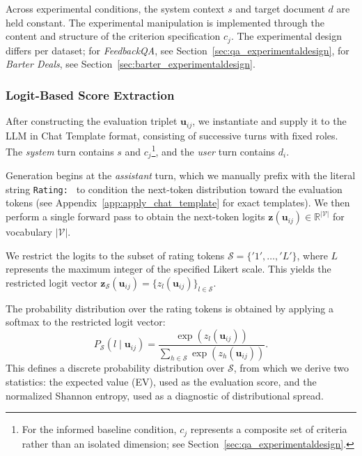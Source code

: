Across experimental conditions, the system context $s$ and target document $d$ are held constant. The experimental manipulation is implemented through the content and structure of the criterion specification $c_j$. The experimental design differs per dataset; for \textit{FeedbackQA}, see Section~\ref{sec:qa_experimentaldesign}, for \textit{Barter Deals}, see Section~\ref{sec:barter_experimentaldesign}. 


\subsubsection{Logit-Based Score Extraction}\label{sec:meth_decoding}

After constructing the evaluation triplet $\mathbf{u}_{ij}$, we instantiate and supply it to the LLM in Chat Template format, consisting of successive turns with fixed roles. The \emph{system} turn contains $s$ and $c_j$\footnote{For the informed baseline condition, $c_j$ represents a composite set of criteria rather than an isolated dimension; see Section~\ref{sec:qa_experimentaldesign}.}, and the \emph{user} turn contains $d_i$.

Generation begins at the \emph{assistant} turn, which we manually prefix with the literal string \texttt{Rating: } to condition the next-token distribution toward the evaluation tokens (see Appendix~\ref{app:apply_chat_template} for exact templates). We then perform a single forward pass to obtain the next-token logits $\mathbf{z}(\mathbf{u}_{ij}) \in \mathbb{R}^{|\mathcal{V}|}$ for vocabulary $|\mathcal{V}|$. 

We restrict the logits to the subset of rating tokens $\mathcal{S} = \{ '1', \dots, 'L' \}$, where $L$ represents the maximum integer of the specified Likert scale. This yields the restricted logit vector $\mathbf{z}_{\mathcal{S}}(\mathbf{u}_{ij}) = \{ z_l(\mathbf{u}_{ij}) \}_{l \in \mathcal{S}}$.

The probability distribution over the rating tokens is obtained by applying a softmax to the restricted logit vector:
\begin{equation}
P_{\mathcal{S}}(l \mid \mathbf{u}_{ij}) = \frac{\exp(z_l(\mathbf{u}_{ij}))}{\sum_{h \in \mathcal{S}} \exp(z_h(\mathbf{u}_{ij}))}.
\end{equation}
This defines a discrete probability distribution over $\mathcal{S}$, from which we derive two statistics: the expected value (EV), used as the evaluation score, and the normalized Shannon entropy, used as a diagnostic of distributional spread.

